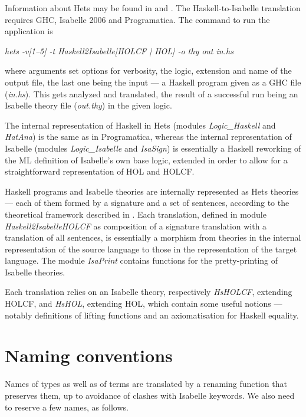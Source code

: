 \documentclass{llncs}
\begin{document}
Information about Hets may be found in \cite{HetsUG} and \cite{HetsUG}. The
Haskell-to-Isabelle translation requires GHC, Isabelle 2006 and Programatica.
The command to run the application is

\emph{hets -v[1--5] -t Haskell2Isabelle[HOLCF | HOL] -o thy out in.hs}

\noindent where arguments set options for verbosity, the logic, extension and name of
the output file, the last one being the input --- a Haskell program given as a
GHC file (\emph{in.hs}). This gets analyzed and translated, the result of a
successful run being an Isabelle theory file (\emph{out.thy}) in the given
logic.


The internal representation of Haskell in Hets (modules \emph{Logic\_Haskell}
and \emph{HatAna}) is the same as in Programatica, whereas the internal
representation of Isabelle (modules \emph{Logic\_Isabelle} and \emph{IsaSign})
is essentially a Haskell reworking of the ML definition of Isabelle's own base
logic, extended in order to allow for a straightforward representation of HOL
and HOLCF.

Haskell programs and Isabelle theories are internally represented as Hets
theories --- each of them formed by a signature and a set of sentences,
according to the theoretical framework described in \cite{MossaTh}.  Each
translation, defined in module \emph{Haskell2IsabelleHOLCF} as composition of
a signature translation with a translation of all sentences, is essentially a
morphism from theories in the internal representation of the source language
to those in the representation of the target language. The module
\emph{IsaPrint} contains functions for the pretty-printing of Isabelle
theories.

Each translation relies on an Isabelle theory, respectively \emph{HsHOLCF},
extending HOLCF, and \emph{HsHOL}, extending HOL, which contain some useful
notions --- notably definitions of lifting functions and an axiomatisation for
Haskell equality.

\section{Naming conventions} \label{section:nam}

Names of types as well as of terms are translated by a renaming function that
preserves them, up to avoidance of clashes with Isabelle keywords. We also
need to reserve a few names, as follows.
\end{document}
